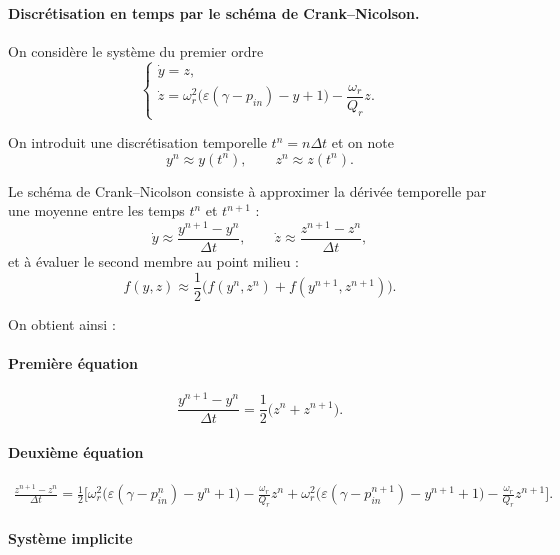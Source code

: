\documentclass[12pt,a4paper]{article}
\begin{document}
\paragraph{Discrétisation en temps par le schéma de Crank--Nicolson.}

On considère le système du premier ordre
\begin{equation}
\begin{cases}
\dot{y} = z, \\
\dot{z} = \omega_r^2 \bigl( \varepsilon(\gamma - p_{in}) - y + 1 \bigr) - \dfrac{\omega_r}{Q_r} z.
\end{cases}
\end{equation}

On introduit une discrétisation temporelle $t^n = n \Delta t$ et on note
$$
y^n \approx y(t^n), \qquad z^n \approx z(t^n).
$$

Le schéma de Crank--Nicolson consiste à approximer la dérivée temporelle par une moyenne entre les temps $t^n$ et $t^{n+1}$ :
$$
\dot{y} \approx \frac{y^{n+1} - y^n}{\Delta t}, \qquad
\dot{z} \approx \frac{z^{n+1} - z^n}{\Delta t},
$$
et à évaluer le second membre au point milieu :
$$
f(y,z) \approx \frac{1}{2}\bigl(f(y^n,z^n) + f(y^{n+1},z^{n+1})\bigr).
$$

On obtient ainsi :

\paragraph{Première équation}
\begin{equation}
\frac{y^{n+1} - y^n}{\Delta t}
= \frac{1}{2}\bigl(z^n + z^{n+1}\bigr).
\end{equation}

\paragraph{Deuxième équation}
\begin{equation}  
\begin{aligned}
\frac{z^{n+1} - z^n}{\Delta t}
= \frac{1}{2} \Big[
\omega_r^2 \bigl( \varepsilon(\gamma - p_{in}^n) - y^n + 1 \bigr)
- \frac{\omega_r}{Q_r} z^n +\omega_r^2 \bigl( \varepsilon(\gamma - p_{in}^{n+1}) - y^{n+1} + 1 \bigr)
- \frac{\omega_r}{Q_r} z^{n+1}
  \Big].
  \end{aligned}
\end{equation}

\paragraph{Système implicite}
\end{document}
